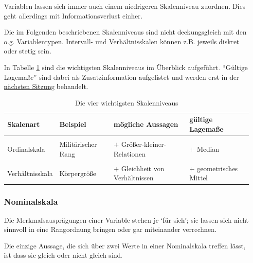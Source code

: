\documentclass[
  11pt,
  ngerman,
  a4paper,
]{report}
\begin{document}
Variablen lassen sich immer auch einem niedrigeren Skalenniveau zuordnen. Dies geht allerdings mit Informationsverlust einher.

Die im Folgenden beschriebenen Skalenniveaus sind nicht deckungsgleich mit den o.g. Variablentypen. Intervall- und Verhältnisskalen können z.B. jeweils diskret oder stetig sein.

In Tabelle \ref{tab:skalen} sind die wichtigsten Skalenniveaus im Überblick aufgeführt. \enquote{Gültige Lagemaße} sind dabei als Zusatzinformation aufgelistet und werden erst in der \protect\hyperlink{lagemauxdfe}{nächsten Sitzung} behandelt.

\begin{table}

\caption{\label{tab:skalen}Die vier wichtigsten Skalenniveaus}
\centering
\begin{tabular}[t]{ll>{\raggedright\arraybackslash}p{8cm}>{\raggedright\arraybackslash}p{8cm}}
\toprule
\textbf{Skalenart} & \textbf{Beispiel} & \textbf{mögliche Aussagen} & \textbf{gültige Lagemaße}\\
\midrule
\cellcolor{gray!6}{Nominalskala} & \cellcolor{gray!6}{Postleitzahl} & \cellcolor{gray!6}{Gleichheit, Verschiedenheit} & \cellcolor{gray!6}{Modus}\\
Ordinalskala & Militärischer Rang & $+$ Größer-kleiner-Relationen & $+$ Median\\
\cellcolor{gray!6}{Intervallskala} & \cellcolor{gray!6}{Temperatur in °C} & \cellcolor{gray!6}{$+$ Gleichheit von Differenzen} & \cellcolor{gray!6}{$+$ arithmetisches Mittel}\\
Verhältnisskala & Körpergröße & $+$ Gleichheit von Verhältnissen & $+$ geometrisches Mittel\\
\bottomrule
\end{tabular}
\end{table}

\hypertarget{nominalskala}{%
\subsubsection{Nominalskala}\label{nominalskala}}

Die Merkmalsausprägungen einer Variable stehen je \enquote*{für sich}; sie lassen sich nicht sinnvoll in eine Rangordnung bringen oder gar miteinander verrechnen.

Die einzige Aussage, die sich über zwei Werte in einer Nominalskala treffen lässt, ist dass sie gleich oder nicht gleich sind.
\end{document}
